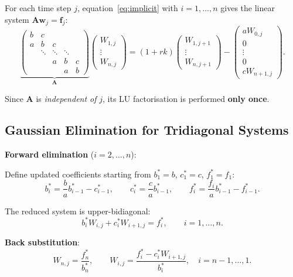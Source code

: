 \documentclass[12pt,a4paper]{article}
\theoremstyle{plain}
\theoremstyle{definition}
\theoremstyle{remark}
\begin{document}
For each time step $j$, equation~\eqref{eq:implicit} with
$i=1,\ldots,n$ gives the linear system $\mathbf{A}\mathbf{w}_{j}=\mathbf{f}_{j}$:
\[
  \underbrace{\begin{pmatrix}
    b & c & & & \\
    a & b & c & & \\
    & \ddots & \ddots & \ddots & \\
    & & a & b & c \\
    & & & a & b
  \end{pmatrix}}_{\mathbf{A}}
  \begin{pmatrix}W_{1,j}\\\vdots\\W_{n,j}\end{pmatrix}
  =(1+rk)\begin{pmatrix}W_{1,j+1}\\\vdots\\W_{n,j+1}\end{pmatrix}
  -\begin{pmatrix}aW_{0,j}\\ 0\\\vdots\\0\\cW_{n+1,j}\end{pmatrix}.
\]

Since $\mathbf{A}$ is \emph{independent of} $j$, its LU factorisation
is performed \textbf{only once}.

\subsection{Gaussian Elimination for Tridiagonal Systems}

\textbf{Forward elimination} ($i=2,\ldots,n$):

Define updated coefficients starting from $b_{1}^{*}=b$,
$c_{1}^{*}=c$, $f_{1}^{*}=f_{1}$:
\begin{equation}\label{eq:gauss_fwd}
  b_{i}^{*}=\frac{b}{a}b_{i-1}^{*}-c_{i-1}^{*},
  \qquad
  c_{i}^{*}=\frac{c}{a}b_{i-1}^{*},
  \qquad
  f_{i}^{*}=\frac{f_{i}}{a}b_{i-1}^{*}-f_{i-1}^{*}.
\end{equation}

The reduced system is upper-bidiagonal:
\[
  b_{i}^{*}W_{i,j}+c_{i}^{*}W_{i+1,j}=f_{i}^{*},\qquad i=1,\ldots,n.
\]

\textbf{Back substitution}:
\begin{equation}\label{eq:gauss_back}
  W_{n,j}=\frac{f_{n}^{*}}{b_{n}^{*}},\qquad
  W_{i,j}=\frac{f_{i}^{*}-c_{i}^{*}W_{i+1,j}}{b_{i}^{*}},
  \quad i=n-1,\ldots,1.
\end{equation}
\end{document}
